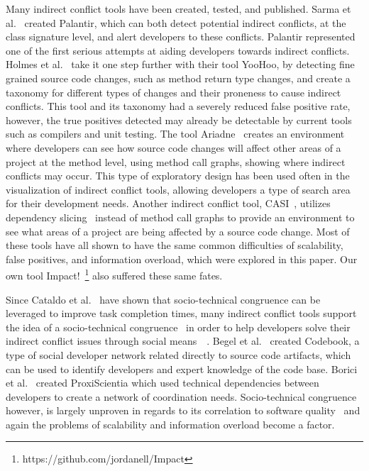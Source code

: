 \documentclass[conference]{IEEEtran}
\begin{document}
Many indirect conflict tools have been created, tested, and published. Sarma et al.~\cite{Sarma:2007:TSA} created Palantir, 
which can both detect potential indirect conflicts, at the class signature level, and alert developers to these conflicts. 
Palantir represented one of the first serious attempts at aiding developers towards indirect conflicts. Holmes et 
al.~\cite{Holmes:2010:CAR} take it one step further with their tool YooHoo, by detecting fine grained source code changes, 
such as method return type changes, and create a taxonomy for different types of changes and their proneness to cause 
indirect conflicts. This tool and its taxonomy had a severely reduced false positive rate, however, the true positives 
detected may already be detectable by current tools such as compilers and unit testing. The tool Ariadne~\cite{Trainer:2005:BGT} 
creates an environment where developers can see how source code changes will affect other areas of a project at the 
method level, using method call graphs, showing where indirect conflicts may occur. This type of exploratory design has 
been used often in the visualization of indirect conflict tools, allowing developers a type of search area for their development
needs. Another indirect conflict tool, CASI~\cite{Servant:2010:CPI}, utilizes dependency slicing~\cite{Bajracharya:2009:SIS} 
instead of method call graphs to provide an environment to see what areas of a project are being affected by a source code change. 
Most of these tools have all shown to have the same common difficulties of scalability, false positives, and information overload, 
which were explored in this paper. Our own tool Impact!~\footnote{https://github.com/jordanell/Impact} also suffered these same fates.

Since Cataldo et al.~\cite{Cataldo:2006:ICR} have shown that socio-technical congruence can be leveraged to improve task completion
times, many indirect conflict tools support the idea of a socio-technical congruence~\cite{Kwan:2011:ESC} in order to help
developers solve their indirect conflict issues through social means~\cite{Begel:2010:CDE}~\cite{Borici:2012:CHA}. 
Begel et al.~\cite{Begel:2010:CDE} created Codebook, a type of social developer network related directly to source code
artifacts, which can be used to identify developers and expert knowledge of the code base. Borici et al.~\cite{Borici:2012:CHA}
created ProxiScientia which used technical dependencies between developers to create a network of coordination needs.
Socio-technical congruence however, is largely unproven in regards to its correlation to
software quality~\cite{Kwan:2011:SCE} and again the problems of scalability and information overload become a factor.
\end{document}
